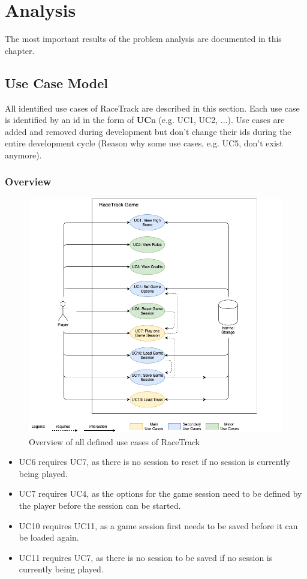 \chapter{Analysis}
	The most important results of the problem analysis are documented in this chapter.
	
\section{Use Case Model}
	All identified use cases of RaceTrack are described in this section. Each use case is identified by an id in the form of \textbf{UC}n (e.g. UC1, UC2, ...). Use cases are added and removed during development but don't change their ids during the entire development cycle (Reason why some use cases, e.g. UC5, don't exist anymore).

	\subsection{Overview}
		\begin{figure}[H]
			\centering
			\includegraphics[width=17cm,keepaspectratio,center]{img/Use-Case-Model_Overview.png}
			\caption{Overview of all defined use cases of RaceTrack}
		\end{figure}
		\begin{itemize}
			\item UC6 requires UC7, as there is no session to reset if no session is currently being played.
			\item UC7 requires UC4, as the options for the game session need to be defined by the player before the session can be started.
			\item UC10 requires UC11, as a game session first needs to be saved before it can be loaded again.
			\item UC11 requires UC7, as there is no session to be saved if no session is currently being played.
		\end{itemize}

